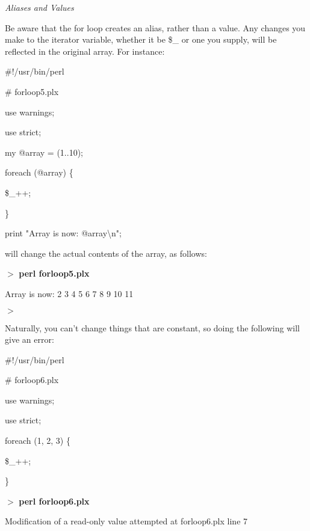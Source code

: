 \documentclass[a4paper,11pt]{book}
\begin{document}
\noindent \textit{Aliases and Values}

\noindent Be aware that the for loop creates an alias, rather than a value. Any changes you make to the iterator variable, whether it be \$\_ or one you supply, will be reflected in the original array. For instance:

\noindent 

\noindent \#!/usr/bin/perl

\noindent \# forloop5.plx

\noindent use warnings;

\noindent use strict;

\noindent 

\noindent my @array = (1..10);

\noindent foreach (@array) \{

\noindent \$\_++;

\noindent \}

\noindent 

\noindent print "Array is now: @array\textbackslash n";

\noindent 

\noindent 

\noindent will change the actual contents of the array, as follows:

\noindent 

\noindent $>$ \textbf{perl forloop5.plx}

\noindent Array is now: 2 3 4 5 6 7 8 9 10 11

\noindent $>$

\noindent 

\noindent Naturally, you can't change things that are constant, so doing the following will give an error:

\noindent 

\noindent \#!/usr/bin/perl

\noindent \# forloop6.plx

\noindent use warnings;

\noindent use strict;

\noindent 

\noindent foreach (1, 2, 3) \{

\noindent \$\_++;

\noindent \}

\noindent 

\noindent $>$ \textbf{perl forloop6.plx}

\noindent Modification of a read-only value attempted at forloop6.plx line 7
\end{document}
